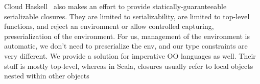 \documentclass{llncs}
\begin{document}

Cloud Haskell~\cite{CloudHaskell} also makes an effort to provide statically-guaranteeable serializable closures. They are limited to serializability, are
limited to top-level functions, and reject an environment or allow controlled
capturing, preserialization of the environment.  For us, management of the
environment is automatic, we don't need to preserialize the env, and our type
constraints are very different. We provide a solution for imperative OO languages 
as well. Their stuff is mostly top-level, whereas in Scala, closures usually refer 
to local objects nested within other objects







\end{document}
